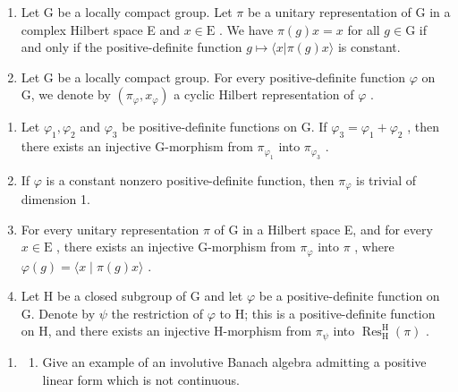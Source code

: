 \exercisesection{}

\begin{enumerate}
\def\labelenumi{\arabic{enumi})}
\item
  Let G be a locally compact group. Let \(\pi\) be a unitary representation of G in a complex Hilbert space E and \(x \in \mathrm{E}\) . We have \(\pi(g)x = x\) for all \(g \in \mathrm{G}\) if and only if the positive-definite function \(g \mapsto \langle x | \pi(g)x \rangle\) is constant.
\item
  Let G be a locally compact group. For every positive-definite function \(\varphi\) on G, we denote by \((\pi_{\varphi}, x_{\varphi})\) a cyclic Hilbert representation of \(\varphi\) .
\end{enumerate}

\begin{enumerate}
\def\labelenumi{\alph{enumi})}
\item
  Let \(\varphi_1, \varphi_2\) and \(\varphi_3\) be positive-definite functions on G. If \(\varphi_3 = \varphi_1 + \varphi_2\) , then there exists an injective G-morphism from \(\pi_{\varphi_1}\) into \(\pi_{\varphi_3}\) .
\item
  If \(\varphi\) is a constant nonzero positive-definite function, then \(\pi_{\varphi}\) is trivial of dimension 1.
\item
  For every unitary representation \(\pi\) of G in a Hilbert space E, and for every \(x \in \mathrm{E}\) , there exists an injective G-morphism from \(\pi_{\varphi}\) into \(\pi\) , where \(\varphi(g) = \langle x \mid \pi(g)x \rangle\) .
\item
  Let H be a closed subgroup of G and let \(\varphi\) be a positive-definite function on G. Denote by \(\psi\) the restriction of \(\varphi\) to H; this is a positive-definite function on H, and there exists an injective H-morphism from \(\pi_{\psi}\) into \(\operatorname{Res}_{\mathrm{H}}^{\mathrm{H}}(\pi)\) .
\end{enumerate}

\begin{enumerate}
\def\labelenumi{\arabic{enumi})}
\setcounter{enumi}{2}
\tightlist
\item
  \begin{enumerate}
  \def\labelenumii{\alph{enumii})}
  \tightlist
  \item
    Give an example of an involutive Banach algebra admitting a positive linear form which is not continuous.
  \end{enumerate}
\end{enumerate}

